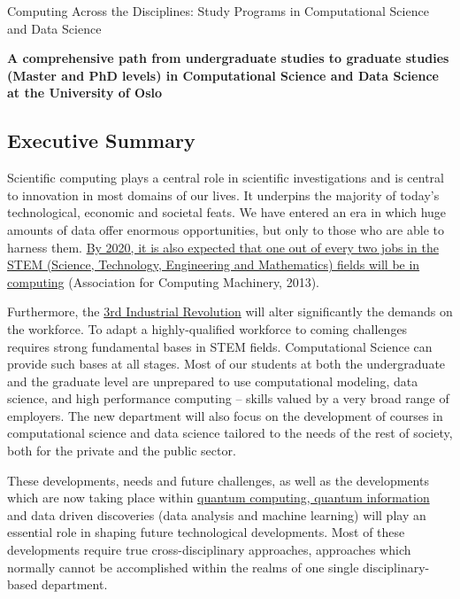 \documentclass[oneside,final,10pt]{article}
\begin{document}
\thispagestyle{empty}

\begin{center}
{\LARGE\bf
\begin{spacing}{1.25}
Computing Across the Disciplines: Study Programs in Computational Science and Data Science
\end{spacing}
}
\end{center}

\begin{center}
{\bf A comprehensive path from undergraduate studies to graduate studies (Master and PhD levels) in Computational Science and Data Science at the University of Oslo }\\ [0mm]
\end{center}


\vspace{1cm}


\subsection*{Executive Summary}



Scientific computing plays a central role in scientific investigations
and is central to innovation in most domains of our lives. It
underpins the majority of today's technological, economic and societal
feats. We have entered an era in which huge amounts of data offer
enormous opportunities, but only to those who are able to harness
them.  \href{{http://pathways.acm.org/executive-summary.html}}{By 2020, it is also expected that one out of every two jobs in
the STEM (Science, Technology, Engineering and Mathematics) fields
will be in computing}
(Association for Computing Machinery, 2013).

Furthermore, the \href{{http://www.economist.com/node/21553017}}{3rd Industrial Revolution} will alter significantly the demands on the workforce. To adapt a highly-qualified workforce to coming challenges  requires strong fundamental bases in STEM fields. Computational Science can provide such bases at all stages. Most of our students at both the undergraduate and the graduate level are unprepared to use computational modeling, data science, and high performance computing – skills valued by a very broad range of employers. The new department will also focus on the development of courses in computational science and data science tailored to the needs of the rest of society, both for the private and the public sector.

These developments, needs and future challenges, as well as
the developments which are now taking place within \href{{https://www.aps.org/publications/apsnews/201802/ostp.cfm?utm_source=APS+Physics+Main+Group&utm_campaign=fb7a2e7d6b-News+021218&utm_medium=email&utm_term=0_825303224b-fb7a2e7d6b-106513221}}{quantum computing, quantum information} and data driven discoveries (data analysis and machine learning) will play an essential role in shaping future technological developments. Most of these developments require true cross-disciplinary approaches, approaches which normally cannot be accomplished within the realms of one single disciplinary-based department. 
\end{document}
